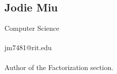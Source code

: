 \documentclass{article}
\begin{document}
\subsection*{Jodie Miu}
   \noindent Computer Science
   \\
   \\ jm7481@rit.edu 
   \\
   \\ Author of the Factorization section.
   
   



 

\end{document}
